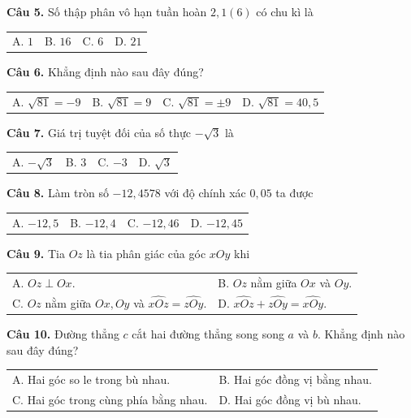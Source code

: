 \documentclass[10.5pt,a4paper]{article}
\begin{document}
\vspace{1mm}
\noindent\textbf{Câu 5.} Số thập phân vô hạn tuần hoàn $2,1(6)$ có chu kì là\\
\begin{tabularx}{\linewidth}{X X X X}
A. $1$ & B. $16$ & C. $6$ & D. $21$
\end{tabularx}

\vspace{1mm}
\noindent\textbf{Câu 6.} Khẳng định nào sau đây đúng?\\
\begin{tabularx}{\linewidth}{X X X X}
A. $\sqrt{81} = -9$ & B. $\sqrt{81} = 9$ & C. $\sqrt{81} = \pm 9$ & D. $\sqrt{81} = 40,5$
\end{tabularx}

\vspace{1mm}
\noindent\textbf{Câu 7.} Giá trị tuyệt đối của số thực $-\sqrt{3}$ là\\
\begin{tabularx}{\linewidth}{X X X X}
A. $-\sqrt{3}$ & B. $3$ & C. $-3$ & D. $\sqrt{3}$
\end{tabularx}

\vspace{1mm}
\noindent\textbf{Câu 8.} Làm tròn số $-12,4578$ với độ chính xác $0,05$ ta được\\
\begin{tabularx}{\linewidth}{X X X X}
A. $-12,5$ & B. $-12,4$ & C. $-12,46$ & D. $-12,45$
\end{tabularx}

\vspace{1mm}
\noindent\textbf{Câu 9.} Tia $Oz$ là tia phân giác của góc $xOy$ khi\\
\begin{tabularx}{\linewidth}{X X}
A. $Oz \perp Ox$. & B. $Oz$ nằm giữa $Ox$ và $Oy$. \\
C. $Oz$ nằm giữa $Ox, Oy$ và $\widehat{xOz} = \widehat{zOy}$. & D. $\widehat{xOz} + \widehat{zOy} = \widehat{xOy}$.
\end{tabularx}

\vspace{1mm}
\noindent\textbf{Câu 10.} Đường thẳng $c$ cắt hai đường thẳng song song $a$ và $b$. Khẳng định nào sau đây đúng?\\
\begin{tabularx}{\linewidth}{X X}
A. Hai góc so le trong bù nhau. & B. Hai góc đồng vị bằng nhau. \\
C. Hai góc trong cùng phía bằng nhau. & D. Hai góc đồng vị bù nhau.
\end{tabularx}
\end{document}
